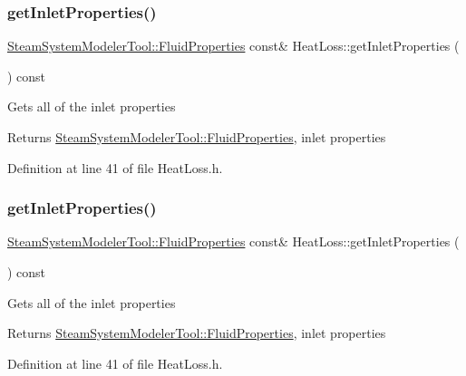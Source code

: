 \subsubsection{\texorpdfstring{get\+Inlet\+Properties()}{getInletProperties()}\hspace{0.1cm}{\footnotesize\ttfamily [1/3]}}
{\footnotesize\ttfamily \hyperlink{struct_steam_system_modeler_tool_1_1_fluid_properties}{Steam\+System\+Modeler\+Tool\+::\+Fluid\+Properties} const\& Heat\+Loss\+::get\+Inlet\+Properties (\begin{DoxyParamCaption}{ }\end{DoxyParamCaption}) const\hspace{0.3cm}{\ttfamily [inline]}}

Gets all of the inlet properties \begin{DoxyReturn}{Returns}
\hyperlink{struct_steam_system_modeler_tool_1_1_fluid_properties}{Steam\+System\+Modeler\+Tool\+::\+Fluid\+Properties}, inlet properties 
\end{DoxyReturn}


Definition at line 41 of file Heat\+Loss.\+h.

\mbox{\label{class_heat_loss_a7bea461460dbacf1855d5375bbf6c097}} 
\subsubsection{\texorpdfstring{get\+Inlet\+Properties()}{getInletProperties()}\hspace{0.1cm}{\footnotesize\ttfamily [2/3]}}
{\footnotesize\ttfamily \hyperlink{struct_steam_system_modeler_tool_1_1_fluid_properties}{Steam\+System\+Modeler\+Tool\+::\+Fluid\+Properties} const\& Heat\+Loss\+::get\+Inlet\+Properties (\begin{DoxyParamCaption}{ }\end{DoxyParamCaption}) const\hspace{0.3cm}{\ttfamily [inline]}}

Gets all of the inlet properties \begin{DoxyReturn}{Returns}
\hyperlink{struct_steam_system_modeler_tool_1_1_fluid_properties}{Steam\+System\+Modeler\+Tool\+::\+Fluid\+Properties}, inlet properties 
\end{DoxyReturn}


Definition at line 41 of file Heat\+Loss.\+h.

